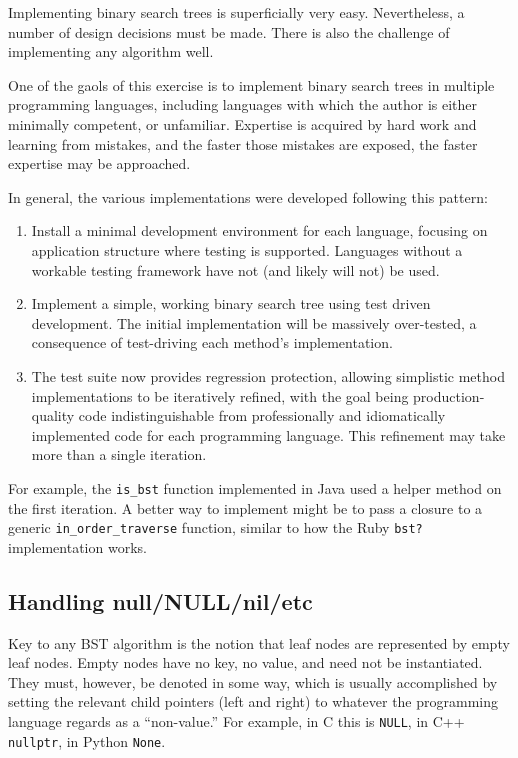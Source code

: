 \documentclass{article}
\begin{document}
Implementing binary search trees is superficially very easy. Nevertheless,
a number of design decisions must be made. There is also the challenge of
implementing any algorithm well.

One of the gaols of this exercise is to implement binary search trees in multiple
programming languages, including languages with which the author is either
minimally competent, or unfamiliar. Expertise is acquired by hard work and
learning from mistakes, and the faster those mistakes are exposed, the
faster expertise may be approached.

In general, the various implementations were developed following this
pattern:

\begin{enumerate}
\item Install a minimal development environment for each language, focusing on
application structure where testing is supported. Languages without a workable
testing framework have not (and likely will not) be used.
\item Implement a simple, working binary search tree using test driven development.
The initial implementation will be massively over-tested, a consequence of
test-driving each method's implementation.
\item The test suite now provides regression protection, allowing simplistic
method implementations to be iteratively refined, with the goal being production-quality
code indistinguishable from professionally and idiomatically implemented code
for each programming language. This refinement may take more than a single iteration.
\end{enumerate}

For example, the {\tt is\_bst} function implemented in Java used a helper
method on the first iteration. A better way to implement might be to pass
a closure to a generic {\tt in\_order\_traverse} function, similar to how
the Ruby {\tt bst?} implementation works.

\subsection{Handling null/NULL/nil/etc}

Key to any BST algorithm is the notion that leaf nodes are represented
by empty leaf nodes. Empty nodes have no key, no value, and need not be
instantiated. They must, however, be denoted in some way, which is
usually accomplished by setting the relevant child pointers (left and
right) to whatever the programming language regards as a ``non-value.''
For example, in C this is {\tt NULL}, in C++ {\tt nullptr}, in Python {\tt None}.
\end{document}
